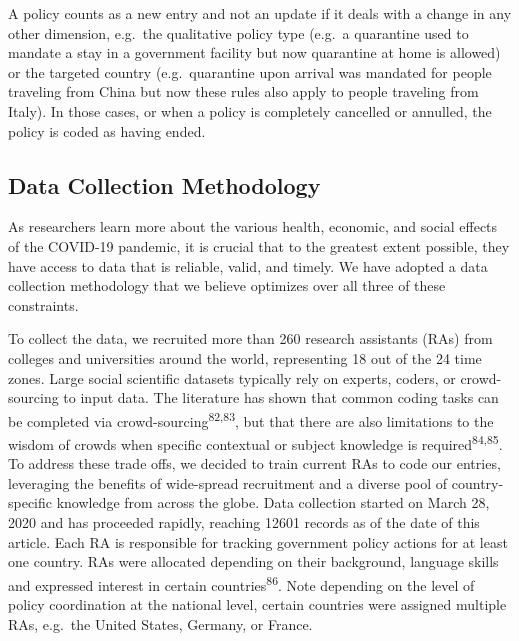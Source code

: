 \documentclass[]{article}
\begin{document}
A policy counts as a new entry and not an update if it deals with a change in any other dimension, e.g.~the qualitative policy type (e.g.~a quarantine used to mandate a stay in a government facility but now quarantine at home is allowed) or the targeted country (e.g.~quarantine upon arrival was mandated for people traveling from China but now these rules also apply to people traveling from Italy). In those cases, or when a policy is completely cancelled or annulled, the policy is coded as having ended.

\hypertarget{data-collection-methodology}{%
\subsection*{Data Collection Methodology}\label{data-collection-methodology}}

As researchers learn more about the various health, economic, and social effects of the COVID-19 pandemic, it is crucial that to the greatest extent possible, they have access to data that is reliable, valid, and timely. We have adopted a data collection methodology that we believe optimizes over all three of these constraints.

To collect the data, we recruited more than 260 research assistants (RAs) from colleges and universities around the world, representing 18 out of the 24 time zones. Large social scientific datasets typically rely on experts, coders, or crowd-sourcing to input data. The literature has shown that common coding tasks can be completed via crowd-sourcing\textsuperscript{82,83}, but that there are also limitations to the wisdom of crowds when specific contextual or subject knowledge is required\textsuperscript{84,85}. To address these trade offs, we decided to train current RAs to code our entries, leveraging the benefits of wide-spread recruitment and a diverse pool of country-specific knowledge from across the globe. Data collection started on March 28, 2020 and has proceeded rapidly, reaching 12601 records as of the date of this article. Each RA is responsible for tracking government policy actions for at least one country. RAs were allocated depending on their background, language skills and expressed interest in certain countries\textsuperscript{86}. Note depending on the level of policy coordination at the national level, certain countries were assigned multiple RAs, e.g.~the United States, Germany, or France.
\end{document}
